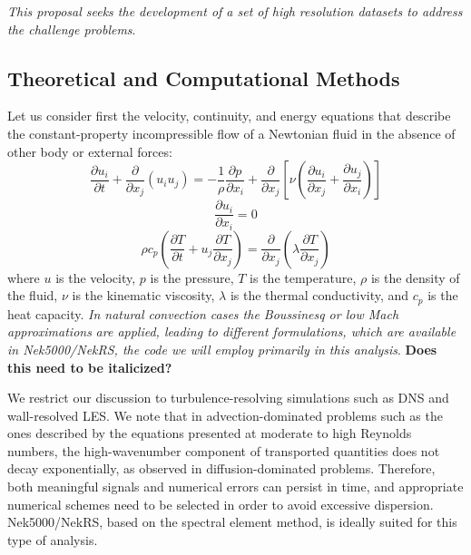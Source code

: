 \documentclass[11pt,letterpaper,english]{article}
\begin{document}

\textit{This proposal seeks the development of a set of high resolution datasets to address the challenge problems}.

\vspace{-.25in}
\subsection{Theoretical and Computational Methods}
\vspace{-.2in}

Let us consider first  the velocity, continuity, and energy equations that describe the constant-property incompressible flow of a Newtonian fluid in the absence of other body or external forces:
\begin{equation}
\frac{\partial  u_i  }{\partial t} +  \frac{\partial}{\partial x_j} \left( u_i u_j \right) =-\frac{1}{\rho} \frac{\partial p}{\partial x_i} + \frac{\partial}{\partial x_j} \left[ \nu \left( \frac{\partial u_i}{\partial x_j} +\frac{\partial u_j}{\partial x_i} \right) \right]
\label{UEqn}
\end{equation}
\begin{equation}
\frac{\partial u_i}{\partial x_i} = 0
\label{rhoEqn}
\end{equation}
\begin{equation}
\rho c_p \left( \frac{\partial T }{\partial t} + u_j \frac{\partial T}{\partial x_j} \right) = \frac{\partial }{\partial x_j} \left( \lambda \frac{\partial T}{\partial x_j} \right)
\label{EEqn}
\end{equation}
where $u$ is the velocity, $p$ is the pressure, $T$ is the temperature, $\rho$ is the  density of the fluid, $\nu$ is the kinematic viscosity, $\lambda$ is the thermal conductivity, and $c_p$ is the heat capacity. \textit{In natural convection cases the Boussinesq or low Mach approximations} \cite{tomboulides1997numerical} \textit{are applied, leading to different formulations, which are available in Nek5000/NekRS, the code we will employ primarily in this analysis}. {\bf Does this need to be italicized?}

We restrict our discussion to turbulence-resolving simulations such as DNS and wall-resolved LES. We note that in advection-dominated problems such as the ones described by the equations presented at moderate to high Reynolds numbers, the high-wavenumber component of transported quantities does not decay exponentially, as observed in diffusion-dominated problems. Therefore, both meaningful signals and numerical errors can persist in time, and appropriate numerical schemes need to be selected in order to avoid excessive dispersion. Nek5000/NekRS, based on the spectral element method, is ideally suited for this type of analysis.
\end{document}
